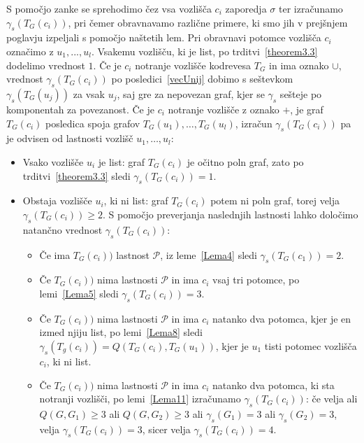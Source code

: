\documentclass[12pt,a4paper,twoside]{article}
\theoremstyle{definition} %
\theoremstyle{plain} %
\numberwithin{equation}{section}  %
\begin{document}
S pomočjo zanke se sprehodimo čez vsa vozlišča $c_i$ zaporedja $\sigma$ ter izračunamo $\gamma_s(T_G(c_i))$, pri čemer obravnavamo različne primere, ki smo jih v prejšnjem poglavju izpeljali s pomočjo naštetih lem. Pri obravnavi potomce vozlišča $c_i$ označimo z $u_1, ..., u_l$. Vsakemu vozlišču, ki je list, po trditvi~\ref{theorem3.3} dodelimo vrednost $1$. Če je  $c_i$ notranje vozlišče kodrevesa $T_G$ in ima oznako $\cup$, vrednost $\gamma_s(T_G(c_i))$ po posledici~\ref{vecUnij} dobimo s seštevkom $\gamma_s(T_G(u_j))$ za vsak $u_j$, saj gre za nepovezan graf, kjer se $\gamma_s$ sešteje po komponentah za povezanost. Če je $c_i$ notranje vozlišče z oznako $+$, je graf $T_G(c_i)$ posledica spoja grafov $T_G(u_1), \dots , T_G(u_l)$, izračun $\gamma_s(T_G(c_i))$ pa je odvisen od lastnosti vozlišč $u_1, \dots, u_l$:
\begin{itemize}
\item Vsako vozlišče $u_i$ je list: graf $T_G(c_i)$ je očitno poln graf, zato po trditvi~\ref{theorem3.3} sledi $\gamma_s(T_G(c_i)) = 1$. 
\item Obstaja vozlišče $u_i$, ki ni list: graf $T_G(c_i)$ potem ni poln graf, torej velja $\gamma_s(T_G(c_i)) \geq 2$. S pomočjo preverjanja naslednjih lastnosti lahko določimo natančno vrednost $\gamma_s(T_G(c_i))$:
\begin{itemize}
\item Če ima $T_G(c_i))$ lastnost $\mathcal{P}$, iz leme~\ref{Lema4} sledi $\gamma_s(T_G(c_1)) = 2$.
\item Če $T_G(c_i))$ nima lastnosti $\mathcal{P}$ in ima $c_i$ vsaj tri potomce, po lemi~\ref{Lema5} sledi $\gamma_s(T_G(c_i)) = 3$.
\item Če $T_G(c_i))$ nima lastnosti $\mathcal{P}$ in ima $c_i$ natanko dva potomca, kjer je en izmed njiju list, po lemi~\ref{Lema8} sledi $\gamma_s(T_g(c_i)) = Q(T_G(c_i), T_G(u_1))$, kjer je $u_1$ tisti potomec vozlišča $c_i$, ki ni list.
\item Če $T_G(c_i))$ nima lastnosti $\mathcal{P}$ in ima $c_i$ natanko dva potomca, ki sta notranji vozlišči, po lemi~\ref{Lema11} izračunamo $\gamma_s(T_G(c_i))$: če velja ali $Q(G, G_1) \geq 3$ ali $Q(G, G_2) \geq 3$ ali $\gamma_s(G_1) = 3$ ali $\gamma_s(G_2) = 3$, velja $\gamma_s(T_G(c_i)) = 3$, sicer velja $\gamma_s(T_G(c_i)) = 4$.
\end{itemize}
\end{itemize}
\end{document}
